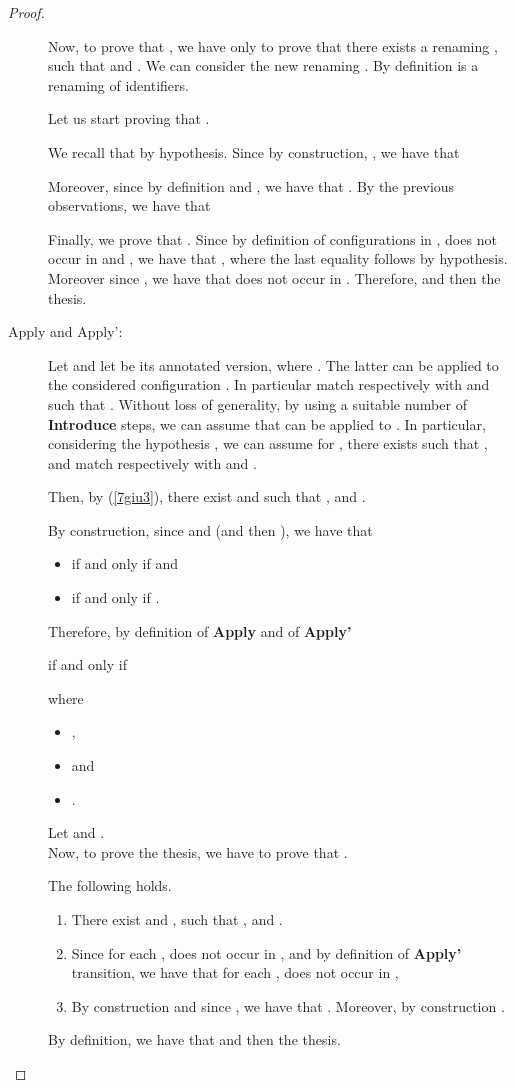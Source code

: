\documentclass{tlp}
\begin{document}
\begin{proof}
\begin{description}
Now, to prove that , we have only to prove that there exists a renaming , such that
 and .
We can consider the new renaming .
By definition  is a renaming of identifiers.

Let us start proving that
.


We recall that
 by hypothesis.
Since by construction, , we have that

Moreover, since by definition  and , we have that
.
By the previous observations, we have that

Finally, we prove that . Since by definition of configurations in ,
 does not occur in  and , we have that , where the last equality follows by hypothesis. Moreover  since , we have that  does  not occur in .
Therefore,  and then the thesis.
\\

\item[Apply and Apply':] Let   and let 
be its annotated version, where .
 The latter can
be applied to the considered configuration . In particular  match respectively with  and  such that
. Without loss of generality, by using a suitable number of {\bf Introduce} steps, we can assume that
 can be applied to . In particular, considering the hypothesis , we can assume for , there exists  such that ,  and  match respectively with  and .

Then, by (\ref{7giu3}), there exist  and  such that
,  and
.

By construction, since  and  (and then
), we have that

\begin{itemize}
\item  if and only if
 and
\item  if and only if
.
\end{itemize}


Therefore, by definition of {\bf Apply} and of {\bf Apply'}

if and only if

where
\begin{itemize}
  \item ,
  \item  and
  \item .
\end{itemize}

Let  and
. \\

Now, to prove the thesis, we have to prove that
.

The following holds.

\begin{enumerate}
\item  There exist  and , such that ,
     and .
\item Since for each ,  does not occur in ,
  and by definition of \textbf{Apply'} transition, we have that for each ,  does not occur in ,
\item By construction and since , we have that .
Moreover, by construction  .
\end{enumerate}
By definition, we have that  and then the thesis.
\end{description}
\end{proof}
\end{document}

